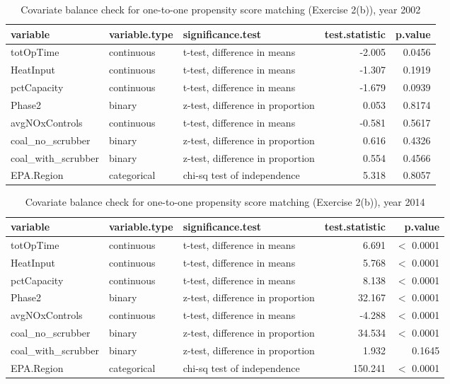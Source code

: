 \begin{enumerate}[(a)]
  \begin{table}[ht]
    \centering
    \begin{tabular}{lllrr}
      \toprule
      variable & variable.type & significance.test & test.statistic & p.value \\ 
      \midrule
      totOpTime & continuous & t-test, difference in means & -2.005 & 0.0456 \\ 
      HeatInput & continuous & t-test, difference in means & -1.307 & 0.1919 \\ 
      pctCapacity & continuous & t-test, difference in means & -1.679 & 0.0939 \\ 
      Phase2 & binary & z-test, difference in proportion & 0.053 & 0.8174 \\ 
      avgNOxControls & continuous & t-test, difference in means & -0.581 & 0.5617 \\ 
      coal\_no\_scrubber & binary & z-test, difference in proportion & 0.616 & 0.4326 \\ 
      coal\_with\_scrubber & binary & z-test, difference in proportion & 0.554 & 0.4566 \\ 
      EPA.Region & categorical & chi-sq test of independence & 5.318 & 0.8057 \\ 
      \bottomrule
    \end{tabular}
    \caption{Covariate balance check for one-to-one propensity score matching (Exercise 2(b)), year 2002} 
    \label{tab-bal2b-02}
  \end{table}

  \begin{table}[ht]
    \centering
    \begin{tabular}{lllrr}
      \toprule
      variable & variable.type & significance.test & test.statistic & p.value \\ 
      \midrule
      totOpTime & continuous & t-test, difference in means & 6.691 & $<$ 0.0001 \\ 
      HeatInput & continuous & t-test, difference in means & 5.768 & $<$ 0.0001 \\ 
      pctCapacity & continuous & t-test, difference in means & 8.138 & $<$ 0.0001 \\ 
      Phase2 & binary & z-test, difference in proportion & 32.167 & $<$ 0.0001 \\ 
      avgNOxControls & continuous & t-test, difference in means & -4.288 & $<$ 0.0001 \\ 
      coal\_no\_scrubber & binary & z-test, difference in proportion & 34.534 & $<$ 0.0001 \\ 
      coal\_with\_scrubber & binary & z-test, difference in proportion & 1.932 & 0.1645 \\ 
      EPA.Region & categorical & chi-sq test of independence & 150.241 & $<$ 0.0001 \\ 
      \bottomrule
    \end{tabular}
    \caption{Covariate balance check for one-to-one propensity score matching (Exercise 2(b)), year 2014} 
    \label{tab-bal2b-14}
  \end{table}


\end{enumerate}
